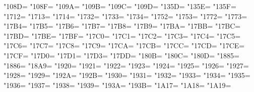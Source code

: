 \XeTeXcharclass"108D=\KclassCM
\XeTeXcharclass"108F=\KclassCM
\XeTeXcharclass"109A=\KclassCM
\XeTeXcharclass"109B=\KclassCM
\XeTeXcharclass"109C=\KclassCM
\XeTeXcharclass"109D=\KclassCM
\XeTeXcharclass"135D=\KclassCM
\XeTeXcharclass"135E=\KclassCM
\XeTeXcharclass"135F=\KclassCM
\XeTeXcharclass"1712=\KclassCM
\XeTeXcharclass"1713=\KclassCM
\XeTeXcharclass"1714=\KclassCM
\XeTeXcharclass"1732=\KclassCM
\XeTeXcharclass"1733=\KclassCM
\XeTeXcharclass"1734=\KclassCM
\XeTeXcharclass"1752=\KclassCM
\XeTeXcharclass"1753=\KclassCM
\XeTeXcharclass"1772=\KclassCM
\XeTeXcharclass"1773=\KclassCM
\XeTeXcharclass"17B4=\KclassCM
\XeTeXcharclass"17B5=\KclassCM
\XeTeXcharclass"17B6=\KclassCM
\XeTeXcharclass"17B7=\KclassCM
\XeTeXcharclass"17B8=\KclassCM
\XeTeXcharclass"17B9=\KclassCM
\XeTeXcharclass"17BA=\KclassCM
\XeTeXcharclass"17BB=\KclassCM
\XeTeXcharclass"17BC=\KclassCM
\XeTeXcharclass"17BD=\KclassCM
\XeTeXcharclass"17BE=\KclassCM
\XeTeXcharclass"17BF=\KclassCM
\XeTeXcharclass"17C0=\KclassCM
\XeTeXcharclass"17C1=\KclassCM
\XeTeXcharclass"17C2=\KclassCM
\XeTeXcharclass"17C3=\KclassCM
\XeTeXcharclass"17C4=\KclassCM
\XeTeXcharclass"17C5=\KclassCM
\XeTeXcharclass"17C6=\KclassCM
\XeTeXcharclass"17C7=\KclassCM
\XeTeXcharclass"17C8=\KclassCM
\XeTeXcharclass"17C9=\KclassCM
\XeTeXcharclass"17CA=\KclassCM
\XeTeXcharclass"17CB=\KclassCM
\XeTeXcharclass"17CC=\KclassCM
\XeTeXcharclass"17CD=\KclassCM
\XeTeXcharclass"17CE=\KclassCM
\XeTeXcharclass"17CF=\KclassCM
\XeTeXcharclass"17D0=\KclassCM
\XeTeXcharclass"17D1=\KclassCM
\XeTeXcharclass"17D3=\KclassCM
\XeTeXcharclass"17DD=\KclassCM
\XeTeXcharclass"180B=\KclassCM
\XeTeXcharclass"180C=\KclassCM
\XeTeXcharclass"180D=\KclassCM
\XeTeXcharclass"1885=\KclassCM
\XeTeXcharclass"1886=\KclassCM
\XeTeXcharclass"18A9=\KclassCM
\XeTeXcharclass"1920=\KclassCM
\XeTeXcharclass"1921=\KclassCM
\XeTeXcharclass"1922=\KclassCM
\XeTeXcharclass"1923=\KclassCM
\XeTeXcharclass"1924=\KclassCM
\XeTeXcharclass"1925=\KclassCM
\XeTeXcharclass"1926=\KclassCM
\XeTeXcharclass"1927=\KclassCM
\XeTeXcharclass"1928=\KclassCM
\XeTeXcharclass"1929=\KclassCM
\XeTeXcharclass"192A=\KclassCM
\XeTeXcharclass"192B=\KclassCM
\XeTeXcharclass"1930=\KclassCM
\XeTeXcharclass"1931=\KclassCM
\XeTeXcharclass"1932=\KclassCM
\XeTeXcharclass"1933=\KclassCM
\XeTeXcharclass"1934=\KclassCM
\XeTeXcharclass"1935=\KclassCM
\XeTeXcharclass"1936=\KclassCM
\XeTeXcharclass"1937=\KclassCM
\XeTeXcharclass"1938=\KclassCM
\XeTeXcharclass"1939=\KclassCM
\XeTeXcharclass"193A=\KclassCM
\XeTeXcharclass"193B=\KclassCM
\XeTeXcharclass"1A17=\KclassCM
\XeTeXcharclass"1A18=\KclassCM
\XeTeXcharclass"1A19=\KclassCM
